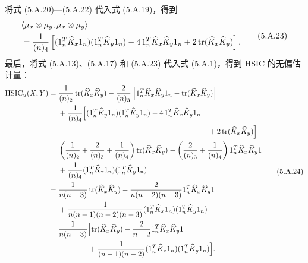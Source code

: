 将式 (5.A.20)—(5.A.22) 代入式 (5.A.19)，得到
\begin{equation}
\begin{aligned}
&\langle\mu_x\otimes\mu_y,\mu_x\otimes\mu_y\rangle\\
&=\frac1{(n)_4}\left[(1_n^T\widehat K_x1_n)(1_n^T\widehat K_y1_n)
-4\,1_n^T\widehat K_x\widehat K_y1_n+2\operatorname{tr}(\widehat K_x\widehat K_y)\right].
\end{aligned}
\tag{5.A.23}
\end{equation}
最后，将式 (5.A.13)、(5.A.17) 和 (5.A.23) 代入式 (5.A.1)，得到 HSIC 的无偏估计量：
\begin{equation}
\begin{aligned}
\mathrm{HSIC}_u(X,Y)
={}&\frac1{(n)_2}\tr(\widehat K_x\widehat K_y)
-\frac2{(n)_3}\left[1_n^T\widehat K_x\widehat K_y1_n-\tr(\widehat K_x\widehat K_y)\right]\\
&+\frac1{(n)_4}\Bigl[(1_n^T\widehat K_y1_n)(1_n^T\widehat K_y1_n)
-4\,1_n^T\widehat K_x\widehat K_y1_n\\
&\hspace{20em}+2\tr(\widehat K_x\widehat K_y)\Bigr]\\
={}&\left(\frac1{(n)_2}+\frac2{(n)_3}+\frac1{(n)_4}\right)\tr(\widehat K_x\widehat K_y)
-\left(\frac2{(n)_3}+\frac1{(n)_4}\right)1_n^T\widehat K_x\widehat K_y1\\
&+\frac1{(n)_4}(1_n^T\widehat K_x1_n)(1_n^T\widehat K_y1_n)\\
={}&\frac1{n(n-3)}\tr(\widehat K_x\widehat K_y)
-\frac2{n(n-2)(n-3)}1_n^T\widehat K_x\widehat K_y1\\
&+\frac1{n(n-1)(n-2)(n-3)}(1_n^T\widehat K_x1_n)(1_n^T\widehat K_y1_n)\\
={}&\frac1{n(n-3)}\Bigl[\tr(\widehat K_x\widehat K_y)
-\frac2{n-2}1_n^T\widehat K_x\widehat K_y1\\
&\hspace{4em}+\frac1{(n-1)(n-2)}(1_n^T\widehat K_x1_n)(1_n^T\widehat K_y1_n)\Bigr].
\end{aligned}
\tag{5.A.24}
\end{equation}
